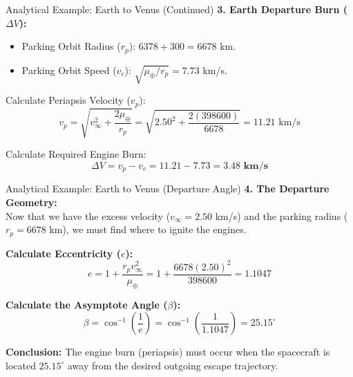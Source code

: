 \documentclass[11pt]{beamer}
\begin{document}
\begin{frame}{Analytical Example: Earth to Venus (Continued)}
    \textbf{3. Earth Departure Burn ($\Delta V$):}
    \begin{itemize}
        \item Parking Orbit Radius ($r_p$): $6378 + 300 = 6678$ km.
        \item Parking Orbit Speed ($v_c$): $\sqrt{\mu_\oplus / r_p} = 7.73$ km/s.
    \end{itemize}
    
    Calculate Periapsis Velocity ($v_p$):
    \begin{equation*}
        v_p = \sqrt{v_\infty^2 + \frac{2\mu_\oplus}{r_p}} = \sqrt{2.50^2 + \frac{2(398600)}{6678}} = 11.21 \text{ km/s}
    \end{equation*}
    
    Calculate Required Engine Burn:
    \begin{equation*}
        \Delta V = v_p - v_c = 11.21 - 7.73 = \mathbf{3.48 \text{ km/s}}
    \end{equation*}
\end{frame}

\begin{frame}{Analytical Example: Earth to Venus (Departure Angle)}
    \textbf{4. The Departure Geometry:} \\
    Now that we have the excess velocity ($v_\infty = 2.50$ km/s) and the parking radius ($r_p = 6678$ km), we must find where to ignite the engines.
    
    \vspace{0.3cm}
    \textbf{Calculate Eccentricity ($e$):}
    \begin{equation*}
        e = 1 + \frac{r_p v_\infty^2}{\mu_\oplus} = 1 + \frac{6678 (2.50)^2}{398600} = \mathbf{1.1047}
    \end{equation*}
    
    \vspace{0.3cm}
    \textbf{Calculate the Asymptote Angle ($\beta$):}
    \begin{equation*}
        \beta = \cos^{-1}\left(\frac{1}{e}\right) = \cos^{-1}\left(\frac{1}{1.1047}\right) = \mathbf{25.15^\circ}
    \end{equation*}
    
    \vspace{0.2cm}
    \textbf{Conclusion:} The engine burn (periapsis) must occur when the spacecraft is located $25.15^\circ$ away from the desired outgoing escape trajectory.
\end{frame}
\end{document}
